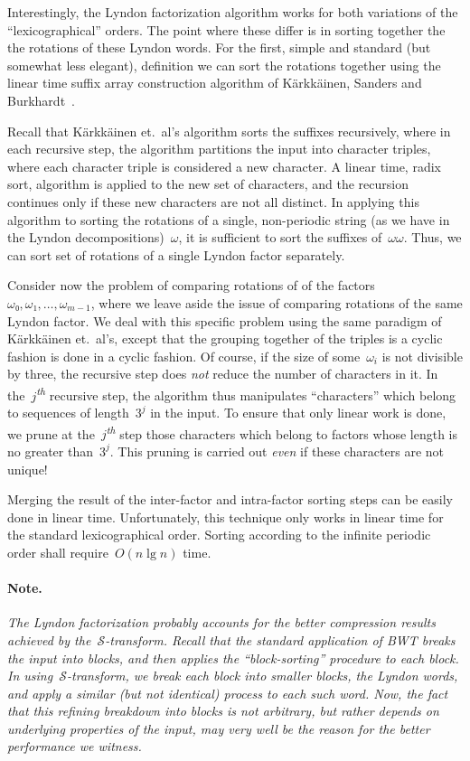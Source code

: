 \documentclass[a4paper,12pt]{article}
\newcommand{\Acronym}{\ensuremath{\mathcal{S}}}
\numberwithin{algorithm}{section}
\begin{document}
Interestingly, the Lyndon factorization algorithm works for both
  variations of the “lexicographical'' orders.
The point where these differ is in sorting together the
  the rotations of these Lyndon words.
For the first, simple and standard (but somewhat less elegant), definition
  we can sort the rotations together using the linear time suffix array construction algorithm of Kärkkäinen, Sanders and
  Burkhardt~\cite{Karkkainen:Sanders:Burkhardt:06}.

Recall that Kärkkäinen et.\ al's  algorithm sorts the suffixes recursively, where in
  each recursive step, the algorithm partitions the input into character triples,
  where each character triple is considered a new character.
A linear time, radix sort, algorithm is applied to the new set of characters,
  and the recursion continues only if these new characters are not all distinct.
In applying this algorithm to sorting the rotations of a single, non-periodic
  string (as we have in the Lyndon decompositions)~$ω$,
  it is sufficient to sort the suffixes of~$ωω$.
Thus, we can sort set of rotations of a single Lyndon factor
  separately.

Consider now the problem of comparing rotations of
  of the factors~$ω₀, ω₁,…, ω_{m-1}$, where we
  leave aside the issue of comparing rotations of the same Lyndon factor.
We deal with this specific problem using the same paradigm
  of  Kärkkäinen et.\ al's, except that the grouping together of the
  triples is a cyclic fashion is done in a cyclic fashion.
Of course, if the size of some~$ω_i$ is not divisible by three,
  the recursive step does \emph{not} reduce the number
  of characters in it.
In the~$j$\textsuperscript{\emph{th}} recursive step, the algorithm thus
  manipulates “characters'' which belong to sequences of length~$3^j$
  in the input.
To ensure that only linear work is done, we prune at the~$j$\textsuperscript{\emph{th}}
  step those characters which belong to factors whose length is no greater than~$3^j$.
This pruning is carried out \emph{even} if these characters are not unique!

Merging the result of the inter-factor and intra-factor sorting steps
  can be easily done in linear time.
Unfortunately, this technique only works in linear time
   for the standard lexicographical
  order.
Sorting according to the infinite periodic order shall require~$O(n \lg n)$
  time.

\paragraph{Note.}\sl The Lyndon factorization probably accounts for the better compression
  results achieved by the~$\Acronym$-transform.
Recall that the standard application of BWT breaks the input into blocks, and then applies the “block-sorting'' procedure to each block.
In using~$\Acronym$-transform, we break each block into smaller blocks, the Lyndon words, and apply a similar (but not identical) process
to each such word.
Now, the fact that this refining breakdown into blocks is not arbitrary, but rather depends on underlying properties of the input,
  may very well be the reason for the better performance we witness.
\vspace{5pt}\rm
\end{document}
